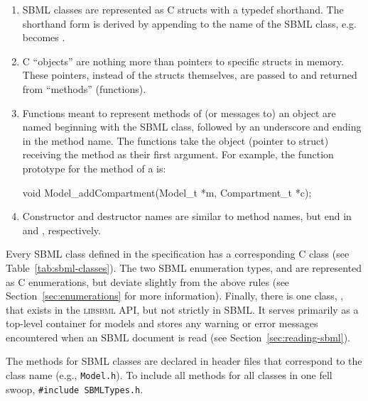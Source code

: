 \documentclass{cekmanual}
\begin{document}
\begin{enumerate}

  \item SBML classes are represented as C structs with a typedef
  shorthand.  The shorthand form is derived by appending 
  to the name of the SBML class, e.g.  becomes
  .

  \item C ``objects'' are nothing more than pointers to specific
  structs in memory.  These pointers, instead of the structs
  themselves, are passed to and returned from ``methods'' (functions).

  \item Functions meant to represent methods of (or messages to) an
  object are named beginning with the SBML class, followed by an
  underscore and ending in the method name.  The functions take the
  object (pointer to struct) receiving the method as their first
  argument.  For example, the function prototype for the
   method of a  is:

    \begin{example}
    void Model_addCompartment(Model_t *m, Compartment_t *c);
    \end{example}

  \item Constructor and destructor names are similar to method names,
  but end in  and , respectively.

\end{enumerate}


Every SBML class defined in the specification has a corresponding C
class (see Table~\ref{tab:sbml-classes}).  The two SBML enumeration
types,  and  are represented as C
enumerations, but deviate slightly from the above rules (see
Section~\ref{sec:enumerations} for more information).  Finally, there
is one class, , that exists in the
\textsc{libsbml} API, but not strictly in SBML.  It serves primarily
as a top-level container for models and stores any warning or error
messages encountered when an SBML document is read (see
Section~\ref{sec:reading-sbml}).

The methods for SBML classes are declared in header files that
correspond to the class name (e.g., \texttt{Model.h}).  To include all
methods for all classes in one fell swoop, \texttt{\#include
SBMLTypes.h}.
\end{document}
